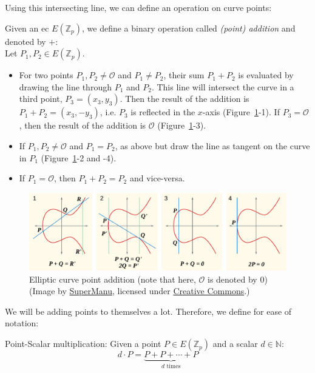 Using this intersecting line, we can define an operation on curve points:
\begin{definition}
    \label{def:point-add}
    Given an \gls{ec} $E(\mathbb{Z}_p)$, we define a binary operation called \emph{(point) addition} and denoted by $+$:~\cite{katz_introduction_2015}\\
    Let $P_1, P_2 \in E(\mathbb{Z}_p)$.

    \begin{itemize}
        \item For two points $P_1, P_2 \neq \mathcal{O}$ and $P_1 \neq P_2$, their sum $P_1 + P_2$ is evaluated by drawing the line through $P_1$ and $P_2$. 
            This line will intersect the curve in a third point, $P_3 = (x_3, y_3)$.
            Then the result of the addition is $P_1 + P_2 = (x_3, -y_3)$, i.e. $P_3$ is reflected in the $x$-axis (Figure~\ref{fig:ecc-point-addition}-1).
            If $P_3 = \mathcal{O}$, then the result of the addition is $\mathcal{O}$ (Figure~\ref{fig:ecc-point-addition}-3).
        \item If $P_1, P_2 \neq \mathcal{O}$ and $P_1 = P_2$, as above but draw the line as tangent on the curve in $P_1$ (Figure~\ref{fig:ecc-point-addition}-2 and -4).
        \item If $P_1 = \mathcal{O}$, then $P_1 + P_2 = P_2$ and vice-versa.
    \end{itemize}
\end{definition} 

\begin{figure}
    \includegraphics[width=\textwidth]{figures/ecc_point_addition.pdf}
    \caption[Elliptic curve point addition]{Elliptic curve point addition (note that here, $\mathcal{O}$ is denoted by $0$)\\(Image by \href{https://commons.wikimedia.org/wiki/File:ECClines-2.svg}{SuperManu}, licensed under \href{https://creativecommons.org/licenses/by-sa/3.0/deed.en}{Creative Commons}.)}
    \label{fig:ecc-point-addition}
\end{figure}

We will be adding points to themselves a lot. Therefore, we define for ease of notation:
\begin{definition}
    Point-Scalar multiplication: Given a point $P \in E(\mathbb{Z}_p)$ and a scalar $d \in \mathbb{N}$: 
    \begin{equation}
        d \cdot P = \underbrace{P + P + \cdots + P}_{d \text{ times}}
    \end{equation}
\end{definition}
 
